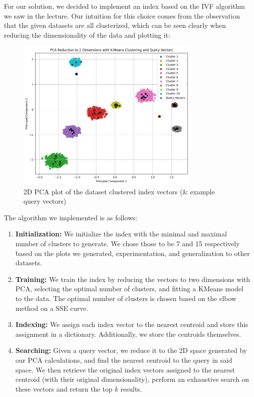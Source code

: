 \documentclass[12pt]{article}
\begin{document}
For our solution, we decided to implement an index based on the IVF algorithm we saw in the lecture. 
Our intuition for this choice comes from the observation that the given datasets are all clusterized, which can be seen clearly when reducing the dimensionality of the data and plotting it:


\begin{figure}[H]
    \centering
    \includegraphics[width=0.8\textwidth]{images/2_2.jpg}
    \caption{2D PCA plot of the dataset clustered index vectors (\& example query vectors)}
\end{figure}

The algorithm we implemented is as follows:

\begin{enumerate}
    \item \textbf{Initialization:} We initialize the index with the minimal and maximal number of clusters to generate. We chose those to be 7 and 15 respectively based on the plots we generated, experimentation, and generalization to other datasets.
    \item \textbf{Training:} We train the index by reducing the vectors to two dimensions with PCA, selecting the optimal number of clusters, and fitting a KMeans model to the data. The optimal number of clusters is chosen based on the elbow method on a SSE curve.
    \item \textbf{Indexing:} We assign each index vector to the nearest centroid and store this assignment in a dictionary. Additionally, we store the centroids themselves.
    \item \textbf{Searching:} Given a query vector, we reduce it to the 2D space generated by our PCA calculations, and find the nearest centroid to the query in said space. 
    We then retrieve the original index vectors assigned to the nearest centroid (with their original dimensionality), perform an exhaustive search on these vectors and return the top $k$ results.
\end{enumerate}
\end{document}
